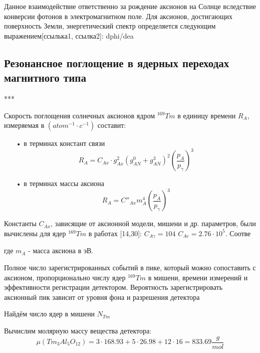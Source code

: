 \documentclass[a4paper,article,14pt]{extarticle}
\begin{document}
Данное взаимодействие ответственно за рождение аксионов на Солнце вследствие конверсии фотонов в электромагнитном поле. Для аксионов, достигающих поверхность Земли, энергетический спектр определяется следующим выражением[ссылька1, ссылка2]:
dphi/dea

\subsection{Резонансное поглощение в ядерных переходах магнитного типа}

***

Скорость поглощения солнечных аксионов ядром $^{169}Tm$ в единицу времени $R_A$, измеряемая в $\left( atom^{-1} \cdot c^{-1}\right)$ составит:
\begin{enumerate}
    \item[•] в терминах констант связи
    \begin{equation}
        {R_A} = {C_{Ax}} \cdot g_{Ax}^2{\left( {g_{AN}^0 + g_{AN}^3} \right)^2}{\left( {\frac{{{p_A}}}{{{p_\gamma }}}} \right)^3}
    \end{equation}
    \item[•] в терминах массы аксиона
    \begin{equation}
   {R_A} = {C''_{Ax}}m_A^4{\left( {\frac{{{p_A}}}{{{p_\gamma }}}} \right)^3}
\end{equation}
\end{enumerate}


Константы $C_{Ax }$, зависящие от аксионной модели, мишени и др. параметров, были вычислены для ядер $^{169}Tm$ в работах [14,30]: $C_{A\gamma } = 104 $ $C_{Ae} = 2.76 \cdot {10^5}$. Соотве




где $m_A$ - масса аксиона в эВ.



Полное число зарегистрированных событий в пике, который можно сопоставить с аксионом, пропорционально числу ядер $^{169}Tm$ в мишени, времени измерений и эффективности регистрации детектором. 
Вероятность зарегистрировать аксионный пик зависит от уровня фона и разрешения детектора

Найдём число ядер в мишени ${N_{Tm}}$

Вычислим молярную массу вещества детектора:
\begin{equation}
    \mu \left( {T{m_3}A{l_5}{O_{12}}} \right) = 3 \cdot 168.93 + 5 \cdot 26.98 + 12 \cdot 16 = 833.69\frac{g}{{mol}}
\end{equation}
\end{document}

